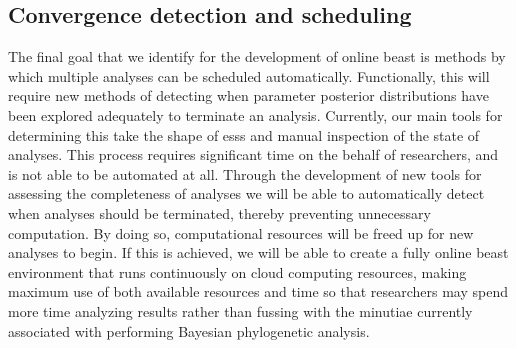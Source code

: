 \subsection{Convergence detection and scheduling}

The final goal that we identify for the development of online \gls{beast} is methods by which multiple analyses can be scheduled automatically.
Functionally, this will require new methods of detecting when parameter posterior distributions have been explored adequately to terminate an analysis.
Currently, our main tools for determining this take the shape of \gls{ess}s and manual inspection of the state of analyses.
This process requires significant time on the behalf of researchers, and is not able to be automated at all.
Through the development of new tools for assessing the completeness of analyses we will be able to automatically detect when analyses should be terminated, thereby preventing unnecessary computation.
By doing so, computational resources will be freed up for new analyses to begin.
If this is achieved, we will be able to create a fully online \gls{beast} environment that runs continuously on cloud computing resources, making maximum use of both available resources and time so that researchers may spend more time analyzing results rather than fussing with the minutiae currently associated with performing Bayesian phylogenetic analysis.


\cleardoublepage


